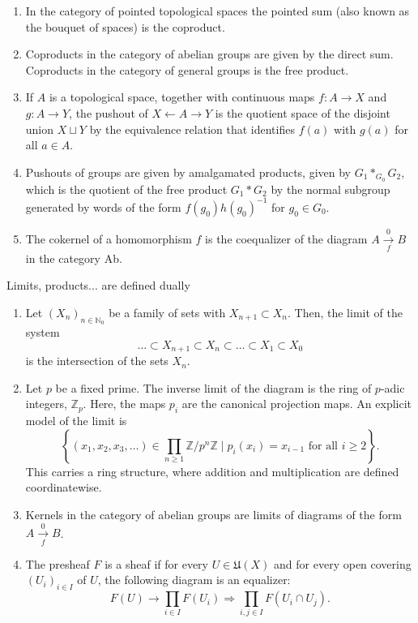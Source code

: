 \begin{example}
\begin{example}[Colimits]
\begin{enumerate}
        \item In the category of pointed topological spaces the pointed sum (also known as the bouquet of spaces) is the coproduct.
        \item Coproducts in the category of abelian groups are given by the direct sum. Coproducts in the category of general groups is the free product.
        \item If $A$ is a topological space, together with continuous maps $f: A \rightarrow X$ and $g: A \rightarrow Y$, the pushout of $X \leftarrow A \rightarrow Y$ is the quotient space of the disjoint union $X \sqcup Y$ by the equivalence relation that identifies $f(a)$ with $g(a)$ for all $a \in A$.
        \item Pushouts of groups are given by amalgamated products, given by $G_1 *_{G_0} G_2$, which is the quotient of the free product $G_1 * G_2$ by the normal subgroup generated by words of the form $f\left(g_0\right) h\left(g_0\right)^{-1}$ for $g_0 \in G_0$.
        \item The cokernel of a homomorphism $f$ is the coequalizer of the diagram $A \underset{f}{\stackrel{0 }{\longrightarrow}} B$ in the category Ab.
    \end{enumerate}
\end{example}

Limits, products... are defined dually

\begin{example}[Limits]
    \begin{enumerate}
        \item Let $\left(X_n\right)_{n \in \mathbb{N}_0}$ be a family of sets with $X_{n+1} \subset X_n$. Then, the limit of the system
        $$
        \ldots \subset X_{n+1} \subset X_n \subset \ldots \subset X_1 \subset X_0
        $$
        is the intersection of the sets $X_n$.
        \item Let $p$ be a fixed prime. The inverse limit of the diagram
        is the ring of $p$-adic integers, $\mathbb{Z}_p$. Here, the maps $p_i$ are the canonical projection maps. An explicit model of the limit is
        $$
        \left\{\left(x_1, x_2, x_3, \ldots\right) \in \prod_{n \geq 1} \mathbb{Z} / p^n \mathbb{Z} \mid p_i\left(x_i\right)=x_{i-1} \text { for all } i \geq 2\right\} .
        $$
        This carries a ring structure, where addition and multiplication are defined coordinatewise.
        \item Kernels in the category of abelian groups are limits of diagrams of the form $A \underset{f}{\stackrel{0}{\longrightarrow}} B$.
        \item The presheaf $F$ is a sheaf if for every $U \in \mathfrak{U}(X)$ and for every open covering $\left(U_i\right)_{i \in I}$ of $U$, the following diagram is an equalizer:
        $$
        F(U) \longrightarrow \prod_{i \in I} F\left(U_i\right) \Longrightarrow \prod_{i, j \in I} F\left(U_i \cap U_j\right) .
        $$
        

\end{enumerate}
\end{example}
\end{example}
